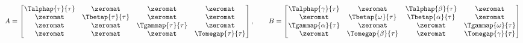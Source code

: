 \begin{equation}
A = \begin{bmatrix}
\Talphap{\tau}{\tau} & \zeromat & \zeromat & \zeromat \\
\zeromat & \Tbetap{\tau}{\tau} & \zeromat & \zeromat  \\
\zeromat & \zeromat & \Tgammap{\tau}{\tau} & \zeromat  \\
\zeromat& \zeromat & \zeromat & \Tomegap{\tau}{\tau} \\
\end{bmatrix}, \qquad
B = \begin{bmatrix}
\Talphap{\gamma}{\tau} & \zeromat              & \Talphap{\beta}{\tau} & \zeromat \\
\zeromat               & \Tbetap{\omega}{\tau} & \Tbetap{\alpha}{\tau} & \zeromat \\
\Tgammap{\alpha}{\tau} & \zeromat              & \zeromat              & \Tgammap{\omega}{\tau} \\
\zeromat               & \Tomegap{\beta}{\tau} & \zeromat              & \Tomegap{\gamma}{\tau}
\end{bmatrix}
\label{eq:matrix_AB}
\end{equation}

